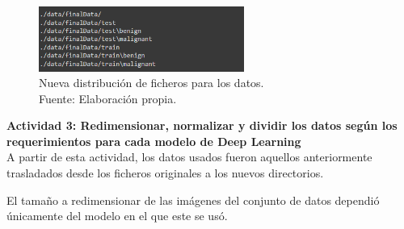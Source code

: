 \begin{figure}[H]
	\begin{center}
		\includegraphics[width=0.60\textwidth]{4/figures/nuevos_ficheros.PNG}
		\caption[Nueva distribución de ficheros para los datos]{Nueva distribución de ficheros para los datos. \\
		Fuente: Elaboración propia.}
		\label{4:fig109}
	\end{center}
\end{figure}

\textbf{Actividad 3: Redimensionar, normalizar y dividir los datos según los requerimientos para cada modelo de Deep Learning}
\\
A partir de esta actividad, los datos usados fueron aquellos anteriormente trasladados desde los ficheros originales a los nuevos directorios.

El tamaño a redimensionar de las imágenes del conjunto de datos dependió únicamente del modelo en el que este se usó.

